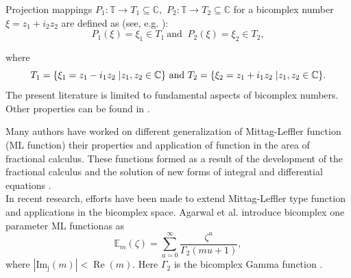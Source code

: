 \documentclass[a4paper,12pt]{article}
\theoremstyle{remark}
\begin{document}
Projection mappings  $P_1 : 	\mathbb{T} \rightarrow T_1 \subseteq \mathbb{C},$ $ P_2 : \mathbb{T} \rightarrow T_2 \subseteq \mathbb{C} $ for a bicomplex number $\xi=z_1+i_2z_2$ are defined as  (see, e.g. \cite{rochon2004b}):\\
\begin{equation}\label{eq:p1}
P_1(\xi)=	\xi_1 \in T_1~\text{and }~P_2(\xi)=\xi_2 \in T_2,
\end{equation}

where
\begin{equation}\label{eq:  a space A1}
T_1= \{\xi_1= z_1-i_1z_2 \hspace{1mm}| z_1,z_2 \in \mathbb{C}\}~\text{and}~ 	T_2= \{\xi_2= z_1+i_1z_2\hspace{1mm} | z_1,z_2 \in \mathbb{C}\}.
\end{equation}
	The present literature is limited to fundamental aspects of bicomplex numbers. 
    Other properties can be found in \cite{price1991,ronn2001,riley1953,meluna2012}.

		Many authors have  worked on different generalization of Mittag-Leffler function (ML function) their properties and application of function in the area of fractional calculus. These functions formed as a result of the development of the fractional calculus and the solution of new forms of integral and differential equations \cite{gorenflo2014}.\\	

In recent research, efforts have been made to extend   Mittag-Leffler type function and applications \cite{agarwal2023bicomplex,ragarwal2022,ragarwal2022sept,ragarwal2021sept,ragarwal2023solution,ragarwal2025} in the bicomplex space. 
  Agarwal et al. \cite{ragarwal2022} introduce bicomplex one parameter ML functionas as 
\begin{equation}\label{eq :ml1}
\mathbb{E}_{m}(\zeta)=\sum_{u=0}^{\infty}\frac{\zeta^u}{\Gamma_2(m u+1 )}, \end{equation}
where $|\operatorname{Im_j}(m)|<\operatorname{Re}(m).$
Here $\Gamma_2$ is the bicomplex Gamma function \cite{goyal2006}. %

\end{document}
